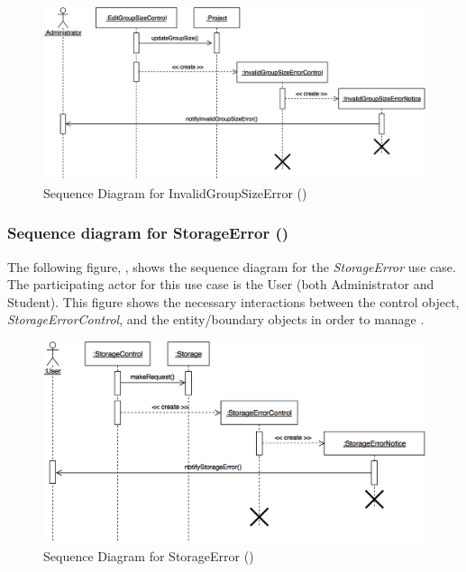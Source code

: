 \documentclass[12pt,letterpaper]{article}
\begin{document}
\begin{figure}[H]
	\centering{}
	\includegraphics[scale=0.27]{imgs/seq/invalid-group-size-error.png}
	\caption[ - Sequence Diagram for InvalidGroupSizeError]{Sequence Diagram for InvalidGroupSizeError ()}
\end{figure}

\subsubsection*{Sequence diagram for StorageError ()}

The following figure, , shows the sequence diagram for the {\it StorageError} use case. The participating actor for this use case is
the User (both Administrator and Student). This figure shows the necessary interactions between the control object, {\it StorageErrorControl}, and the
entity/boundary objects in order to manage .

\begin{figure}[H]
	\centering{}
	\includegraphics[scale=0.27]{imgs/seq/storage-error.png}
	\caption[ - Sequence Diagram for StorageError]{Sequence Diagram for StorageError ()}
\end{figure}
\end{document}

